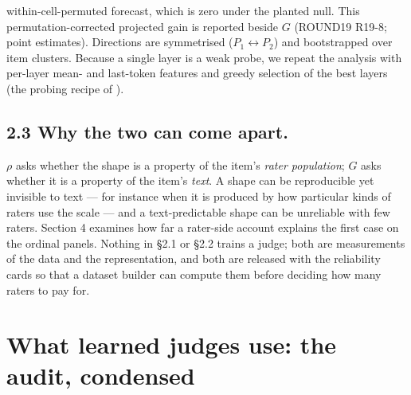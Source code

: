 \documentclass[10pt]{article}
\begin{document}
within-cell-permuted forecast, which is zero under the planted null. This permutation-corrected projected gain is reported beside \(G\) (ROUND19 R19-8; point estimates). Directions are symmetrised (\(P_1\leftrightarrow P_2\)) and bootstrapped over item clusters. Because a single layer is a weak probe, we repeat the analysis with per-layer mean- and last-token features and greedy selection of the best layers (the probing recipe of \citealp{li2026rethinking}).

\subsection*{2.3 Why the two can come apart.} \(\rho\) asks whether the shape is a property of the item's \emph{rater population}; \(G\) asks whether it is a property of the item's \emph{text}. A shape can be reproducible yet invisible to text --- for instance when it is produced by how particular kinds of raters use the scale --- and a text-predictable shape can be unreliable with few raters. Section 4 examines how far a rater-side account explains the first case on the ordinal panels. Nothing in \S{}2.1 or \S{}2.2 trains a judge; both are measurements of the data and the representation, and both are released with the reliability cards so that a dataset builder can compute them before deciding how many raters to pay for.

\section{What learned judges use: the audit, condensed}
\end{document}
